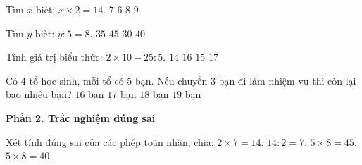 \begin{ex} %
Tìm $x$ biết: $x \times 2 = 14$.
\choice
{\True $7$}
{$6$}
{$8$}
{$9$}
\end{ex}

\begin{ex} %
Tìm $y$ biết: $y : 5 = 8$.
\choice
{$35$}
{$45$}
{$30$}
{\True $40$}
\end{ex}

\begin{ex} %
Tính giá trị biểu thức: $2 \times 10 - 25 : 5$.
\choice
{$14$}
{$16$}
{\True $15$}
{$17$}
\end{ex}

\begin{ex} %
Có 4 tổ học sinh, mỗi tổ có 5 bạn. Nếu chuyển 3 bạn đi làm nhiệm vụ thì còn lại bao nhiêu bạn?
\choice
{$16$ bạn}
{\True $17$ bạn}
{$18$ bạn}
{$19$ bạn}
\end{ex}

\textbf{Phần 2. Trắc nghiệm đúng sai}

\begin{ex} %
Xét tính đúng sai của các phép toán nhân, chia:
\choiceTF
{\True $2 \times 7 = 14$.}
{\True $14 : 2 = 7$.}
{$5 \times 8 = 45$.}
{\True $5 \times 8 = 40$.}
\end{ex}

